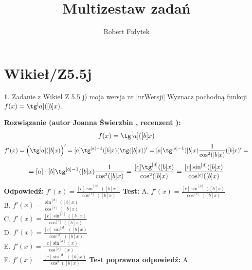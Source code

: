 \documentclass[12pt, a4paper]{article}
\title{Multizestaw zadań}
\author{Robert Fidytek}
\date{}
\theoremstyle{definition} %
\newtheorem{zad}{}
\newcommand{\kategoria}[1]{\section{#1}} %
\newcommand{\zadStart}[1]{\begin{zad}#1\newline} %
\newcommand{\zadStop}{\end{zad}}   %
\newcommand{\rozwStart}[2]{\noindent \textbf{Rozwiązanie (autor #1 , recenzent #2): }\newline} %
\newcommand{\rozwStop}{\newline}                                            %
\newcommand{\odpStart}{\noindent \textbf{Odpowiedź:}\newline}    %
\newcommand{\odpStop}{\newline}                                             %
\newcommand{\testStart}{\noindent \textbf{Test:}\newline} %
\newcommand{\testStop}{\newline} %
\newcommand{\kluczStart}{\noindent \textbf{Test poprawna odpowiedź:}\newline} %
\newcommand{\kluczStop}{\newline} %
\begin{document}
\maketitle


\kategoria{Wikieł/Z5.5j}
\zadStart{Zadanie z Wikieł Z 5.5 j) moja wersja nr [nrWersji]}
Wyznacz pochodną funkcji \\ $f(x)=\tg^[a]([b]x)$.
\zadStop
\rozwStart{Joanna Świerzbin}{}
$$f(x)=\tg^[a]([b]x)$$
$$f'(x)= \left( \tg^[a]([b]x) \right)' = [a]\tg^{[a]-1}([b]x)(\tg([b]x))'=[a]\tg^{[a]-1}([b]x)\frac{1}{\cos^2([b]x)}([b]x)'=$$
$$=[a]\cdot[b]\tg^{[a]-1}([b]x)\frac{1}{\cos^2([b]x)}= \frac{[c]\tg^{[d]}([b]x)}{\cos^2([b]x)}= \frac{[c]\sin^{[d]}([b]x)}{\cos^{[e]}([b]x)}$$
\rozwStop
\odpStart
$ f'(x) = \frac{[c]\sin^{[d]}([b]x)}{\cos^{[e]}([b]x)} $
\odpStop
\testStart
A. $ f'(x) = \frac{[c]\sin^{[d]}([b]x)}{\cos^{[e]}([b]x)} $\\
B. $ f'(x) = \frac{\sin^{[d]}([b]x)}{\cos^{[e]}([b]x)} $ \\
C. $ f'(x) = \frac{[c]\sin^{[e]}([b]x)}{\cos^{[e]}([b]x)} $ \\
D. $ f'(x) = \frac{[c]\sin^{[d]}([b]x)}{\cos^{[d]}([b]x)} $\\
E. $ f'(x) = \frac{[c]\sin^{[d]}(x)}{\cos^{[e]}(x)} $\\
F. $ f'(x) = \frac{[c]\sin^{[d]}([b]x)}{\cos^{2}([b]x)} $
\testStop
\kluczStart
A
\kluczStop
\end{document}
